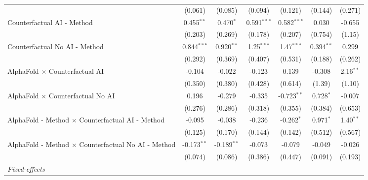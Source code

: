 \begin{tabular}{lcccccc}
                                                              & (0.061)       & (0.085)       & (0.094)       & (0.121)       & (0.144)      & (0.271)\\   
   Counterfactual AI - Method                                 & 0.455$^{**}$  & 0.470$^{*}$   & 0.591$^{***}$ & 0.582$^{***}$ & 0.030        & -0.655\\   
                                                              & (0.203)       & (0.269)       & (0.178)       & (0.207)       & (0.754)      & (1.15)\\   
   Counterfactual No AI - Method                              & 0.844$^{***}$ & 0.920$^{**}$  & 1.25$^{***}$  & 1.47$^{***}$  & 0.394$^{**}$ & 0.299\\   
                                                              & (0.292)       & (0.369)       & (0.407)       & (0.531)       & (0.188)      & (0.262)\\   
   AlphaFold $\times$ Counterfactual AI                       & -0.104        & -0.022        & -0.123        & 0.139         & -0.308       & 2.16$^{**}$\\   
                                                              & (0.350)       & (0.380)       & (0.428)       & (0.614)       & (1.39)       & (1.10)\\   
   AlphaFold $\times$ Counterfactual No AI                    & 0.196         & -0.279        & -0.335        & -0.723$^{**}$ & 0.728$^{*}$  & -0.007\\   
                                                              & (0.276)       & (0.286)       & (0.318)       & (0.355)       & (0.384)      & (0.653)\\   
   AlphaFold - Method $\times$ Counterfactual AI - Method     & -0.095        & -0.038        & -0.236        & -0.262$^{*}$  & 0.971$^{*}$  & 1.40$^{**}$\\   
                                                              & (0.125)       & (0.170)       & (0.144)       & (0.142)       & (0.512)      & (0.567)\\   
   AlphaFold - Method $\times$ Counterfactual No AI - Method  & -0.173$^{**}$ & -0.189$^{**}$ & -0.073        & -0.079        & -0.049       & -0.026\\   
                                                              & (0.074)       & (0.086)       & (0.386)       & (0.447)       & (0.091)      & (0.193)\\   
   \midrule
   \emph{Fixed-effects}\\

\end{tabular}
